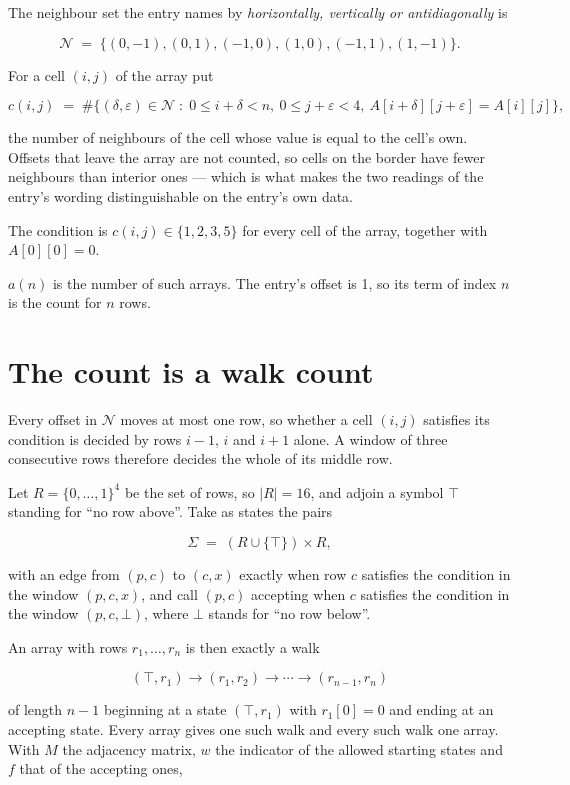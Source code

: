 \documentclass[11pt]{article}
\theoremstyle{definition}
\begin{document}
The neighbour set the entry names by {\itshape horizontally, vertically or antidiagonally} is

\[\mathcal{N} \;=\; \{(0,-1), (0,1), (-1,0), (1,0), (-1,1), (1,-1)\}.\]

For a cell $(i,j)$ of the array put

\[c(i,j) \;=\; \#\bigl\{(\delta,\varepsilon)\in\mathcal{N} \;:\; 0\le i+\delta<n,\ 0\le j+\varepsilon<4,\ A[i+\delta][j+\varepsilon] = A[i][j]\bigr\},\]

the number of neighbours of the cell whose value is equal to the cell's own. Offsets that leave the array are not counted, so cells on the border have fewer neighbours than interior ones --- which is what makes the two readings of the entry's wording distinguishable on the entry's own data.

The condition is $c(i,j) \in \{1, 2, 3, 5\}$ for every cell of the array, together with $A[0][0]=0$.

$a(n)$ is the number of such arrays. The entry's offset is 1, so its term of index $n$ is the count for $n$ rows.

\section{The count is a walk count}

Every offset in $\mathcal{N}$ moves at most one row, so whether a cell $(i,j)$ satisfies its condition is decided by rows $i-1$, $i$ and $i+1$ alone. A window of three consecutive rows therefore decides the whole of its middle row.

Let $R = \{0,\dots,1\}^{4}$ be the set of rows, so $|R| = 16$, and adjoin a symbol $\top$ standing for ``no row above''. Take as states the pairs

\[\Sigma \;=\; (R \cup \{\top\}) \times R,\]

with an edge from $(p,c)$ to $(c,x)$ exactly when row $c$ satisfies the condition in the window $(p,c,x)$, and call $(p,c)$ accepting when $c$ satisfies the condition in the window $(p,c,\bot)$, where $\bot$ stands for ``no row below''.

An array with rows $r_1,\dots,r_n$ is then exactly a walk

\[(\top,r_1) \to (r_1,r_2) \to \cdots \to (r_{n-1},r_n)\]

of length $n-1$ beginning at a state $(\top,r_1)$ with $r_1[0]=0$ and ending at an accepting state. Every array gives one such walk and every such walk one array. With $M$ the adjacency matrix, $w$ the indicator of the allowed starting states and $f$ that of the accepting ones,
\end{document}
